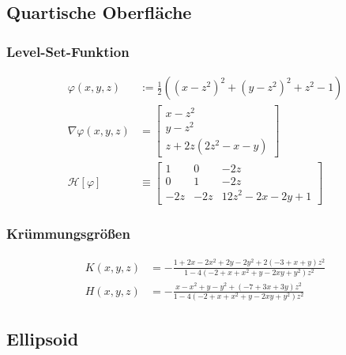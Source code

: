   \subsection{Quartische Oberfläche}
    \label{heineB}
    
    \subsubsection{Level-Set-Funktion}
      \begin{align}
        \varphi(x,y,z) &:= \frac{1}{2}\left( (x-z^{2})^{2} + (y-z^{2})^{2} + z^{2} - 1 \right) \\
        \nabla\varphi(x,y,z) &=\begin{bmatrix}
                                    x - z^{2} \\
                                    y-z^{2}\\
                                    z + 2z\left( 2z^{2}-x-y \right)
                                \end{bmatrix} \\
        \mathcal{H}[\varphi] &\equiv \begin{bmatrix} 1 & 0 & -2z \\
                                             0 & 1 & -2z \\
                                             -2z & -2z & 12z^{2} - 2x -2y + 1\end{bmatrix}
      \end{align}

     \subsubsection{Krümmungsgrößen}
      \begin{align}
        K(x,y,z) &= -\frac{1 + 2x - 2x^{2} + 2y - 2y^{2} + 2(-3 + x + y)z^{2}}
                          {1 - 4(-2 + x + x^{2} + y - 2xy + y^{2})z^{2}} \\
        H(x,y,z) &= -\frac{x - x^{2} + y - y^{2} + (-7 + 3x + 3y)z^{2}}
                         {1 - 4(-2 + x + x^{2} + y - 2xy + y^{2})z^{2}}
      \end{align}

  \subsection{Ellipsoid}
    \label{heineC}
    
